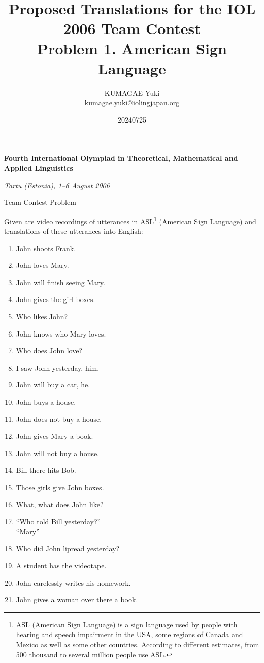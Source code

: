 \documentclass[12pt]{article}
\title{\Large Proposed Translations for the IOL 2006 Team Contest\\\large Problem 1. American Sign Language}
\author{KUMAGAE Yuki\\
{\small\url{kumagae.yuki@iolingjapan.org}}}
\date{20240725}
\begin{document}
\pagestyle{empty}

\begin{center}
\textbf{Fourth International Olympiad in Theoretical, Mathematical and Applied Linguistics}

\textit{Tartu (Estonia), 1--6 August 2006}

Team Contest Problem
\end{center}

Given are video recordings of utterances in ASL\footnote{ASL (American Sign Language) is a sign language used by people with hearing and speech impairment in the USA, some regions of Canada and Mexico as well as some other countries. According to different estimates, from 500 thousand to several million people use ASL.} (American Sign Language) and translations of these utterances into English:

\begin{multicols}{2}
\begin{enumerate}
    \item John shoots Frank.
    \item John loves Mary.
    \item John will finish seeing Mary.
    \item John gives the girl boxes.
    \item Who likes John?
    \item John knows who Mary loves.
    \item Who does John love?
    \item I saw John yesterday, him.
    \item John will buy a car, he.
    \item John buys a house.
    \item John does not buy a house.
    \item John gives Mary a book.
    \item John will not buy a house.
    \item Bill there hits Bob.
    \item Those girls give John boxes.
    \item What, what does John like?
    \item ``Who told Bill yesterday?''\\``Mary''
    \item Who did John lipread yesterday?
    \item A student has the videotape.
    \item John carelessly writes his homework.
    \item John gives a woman over there a book.
\end{enumerate}
\end{multicols}
\end{document}

